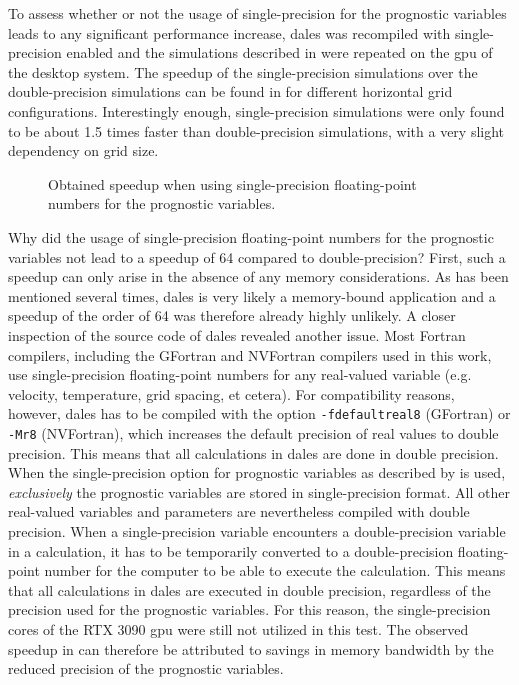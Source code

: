 To assess whether or not the usage of single-precision for the prognostic variables leads to any significant performance increase, \acrshort{dales} was recompiled with single-precision enabled and the simulations described in  were repeated on the \acrshort{gpu} of the desktop system. The speedup of the single-precision simulations over the double-precision simulations can be found in  for different horizontal grid configurations. Interestingly enough, single-precision simulations were only found to be about 1.5 times faster than double-precision simulations, with a very slight dependency on grid size.

\begin{figure}[h!]
    \centering
    
    \caption{Obtained speedup when using single-precision floating-point numbers for the prognostic variables.}
    \label{fig:single_vs_double_precision}
\end{figure}

Why did the usage of single-precision floating-point numbers for the prognostic variables not lead to a speedup of 64 compared to double-precision? First, such a speedup can only arise in the absence of any memory considerations. As has been mentioned several times, \acrshort{dales} is very likely a memory-bound application and a speedup of the order of 64 was therefore already highly unlikely. A closer inspection of the source code of \acrshort{dales} revealed another issue. Most Fortran compilers, including the GFortran and NVFortran compilers used in this work, use single-precision floating-point numbers for any real-valued variable (e.g. velocity, temperature, grid spacing, et cetera). For compatibility reasons, however, \acrshort{dales} has to be compiled with the option \texttt{-fdefaultreal8} (GFortran) or \texttt{-Mr8} (NVFortran), which increases the default precision of real values to double precision. This means that all calculations in \acrshort{dales} are done in double precision. When the single-precision option for prognostic variables as described by \citet{janssonCloudBotanyShallow2023} is used, \emph{exclusively} the prognostic variables are stored in single-precision format. All other real-valued variables and parameters are nevertheless compiled with double precision. When a single-precision variable encounters a double-precision variable in a calculation, it has to be temporarily converted to a double-precision floating-point number for the computer to be able to execute the calculation. This means that all calculations in \acrshort{dales} are executed in double precision, regardless of the precision used for the prognostic variables. For this reason, the single-precision cores of the RTX 3090 \acrshort{gpu} were still not utilized in this test. The observed speedup in  can therefore be attributed to savings in memory bandwidth by the reduced precision of the prognostic variables.